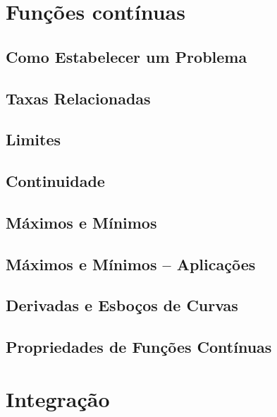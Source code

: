 \documentclass{svmono}
\begin{document}
\chapterproblems

\chapter{Funções contínuas}
\label{chp:contfunc}

\section{Como Estabelecer um Problema}
\label{sec:howtoproblem}

\section{Taxas Relacionadas}
\label{sec:relatedrates}

\section{Limites}
\label{sec:limits}

\section{Continuidade}
\label{sec:continuity}

\section{Máximos e Mínimos}
\label{sec:maxmin}

\section{Máximos e Mínimos -- Aplicações}
\label{sec:maxminappl}

\section{Derivadas e Esboços de Curvas}
\label{sec:derivsketch}

\section{Propriedades de Funções Contínuas}
\label{sec:propcont}

\chapterproblems

\chapter{Integração}
\label{chp:integration}
\end{document}
